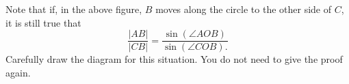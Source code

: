 \documentclass[newpage,hints,handout]{ximera}
\begin{document}
\begin{problem}
Note that if, in the above figure, $B$ moves along the
circle to the other side of $C$, it is still true that%
\[
\frac{\left\vert AB\right\vert }{\left\vert CB\right\vert }=\frac
{\sin\left(  \angle AOB\right)  }{\sin\left(  \angle
COB\right).  }%
\]
Carefully draw the diagram for this situation.  You do not need to give the
proof again.
\end{problem}
\end{document}
